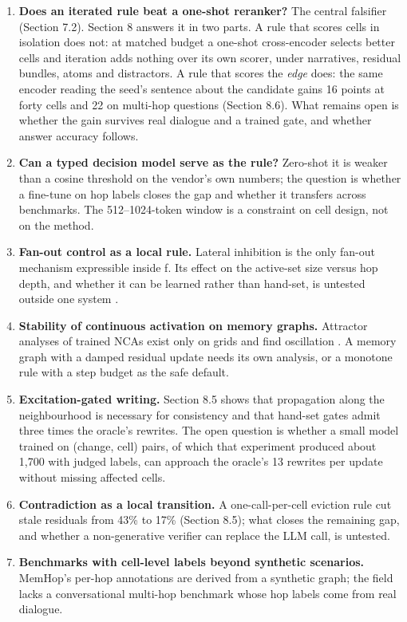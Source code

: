 \documentclass[11pt]{article}
\begin{document}
\begin{enumerate}
\item \textbf{Does an iterated rule beat a one-shot reranker?} The central falsifier (Section 7.2). Section 8 answers it in two parts. A rule that scores cells in isolation does not: at matched budget a one-shot cross-encoder selects better cells and iteration adds nothing over its own scorer, under narratives, residual bundles, atoms and distractors. A rule that scores the \emph{edge} does: the same encoder reading the seed's sentence about the candidate gains 16 points at forty cells and 22 on multi-hop questions (Section 8.6). What remains open is whether the gain survives real dialogue and a trained gate, and whether answer accuracy follows.
\item \textbf{Can a typed decision model serve as the rule?} Zero-shot it is weaker than a cosine threshold on the vendor's own numbers; the question is whether a fine-tune on hop labels closes the gap and whether it transfers across benchmarks. The 512--1024-token window is a constraint on cell design, not on the method.
\item \textbf{Fan-out control as a local rule.} Lateral inhibition is the only fan-out mechanism expressible inside f. Its effect on the active-set size versus hop depth, and whether it can be learned rather than hand-set, is untested outside one system \cite{synapse}.
\item \textbf{Stability of continuous activation on memory graphs.} Attractor analyses of trained NCAs exist only on grids and find oscillation \cite{nca-attractors,nca-landscape}. A memory graph with a damped residual update needs its own analysis, or a monotone rule with a step budget as the safe default.
\item \textbf{Excitation-gated writing.} Section 8.5 shows that propagation along the neighbourhood is necessary for consistency and that hand-set gates admit three times the oracle's rewrites. The open question is whether a small model trained on (change, cell) pairs, of which that experiment produced about 1,700 with judged labels, can approach the oracle's 13 rewrites per update without missing affected cells.
\item \textbf{Contradiction as a local transition.} A one-call-per-cell eviction rule cut stale residuals from 43\% to 17\% (Section 8.5); what closes the remaining gap, and whether a non-generative verifier can replace the LLM call, is untested.
\item \textbf{Benchmarks with cell-level labels beyond synthetic scenarios.} MemHop's per-hop annotations are derived from a synthetic graph; the field lacks a conversational multi-hop benchmark whose hop labels come from real dialogue.

\end{enumerate}
\end{document}
